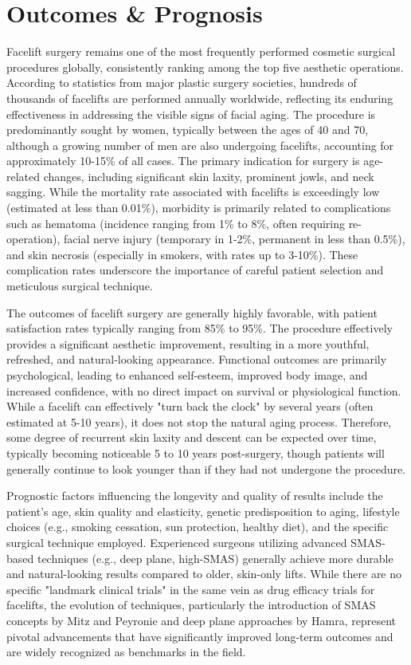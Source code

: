 \section*{Outcomes \& Prognosis}
Facelift surgery remains one of the most frequently performed cosmetic surgical procedures globally, consistently ranking among the top five aesthetic operations. According to statistics from major plastic surgery societies, hundreds of thousands of facelifts are performed annually worldwide, reflecting its enduring effectiveness in addressing the visible signs of facial aging. The procedure is predominantly sought by women, typically between the ages of 40 and 70, although a growing number of men are also undergoing facelifts, accounting for approximately 10-15\% of all cases. The primary indication for surgery is age-related changes, including significant skin laxity, prominent jowls, and neck sagging. While the mortality rate associated with facelifts is exceedingly low (estimated at less than 0.01\%), morbidity is primarily related to complications such as hematoma (incidence ranging from 1\% to 8\%, often requiring re-operation), facial nerve injury (temporary in 1-2\%, permanent in less than 0.5\%), and skin necrosis (especially in smokers, with rates up to 3-10\%). These complication rates underscore the importance of careful patient selection and meticulous surgical technique.

The outcomes of facelift surgery are generally highly favorable, with patient satisfaction rates typically ranging from 85\% to 95\%. The procedure effectively provides a significant aesthetic improvement, resulting in a more youthful, refreshed, and natural-looking appearance. Functional outcomes are primarily psychological, leading to enhanced self-esteem, improved body image, and increased confidence, with no direct impact on survival or physiological function. While a facelift can effectively "turn back the clock" by several years (often estimated at 5-10 years), it does not stop the natural aging process. Therefore, some degree of recurrent skin laxity and descent can be expected over time, typically becoming noticeable 5 to 10 years post-surgery, though patients will generally continue to look younger than if they had not undergone the procedure.

Prognostic factors influencing the longevity and quality of results include the patient's age, skin quality and elasticity, genetic predisposition to aging, lifestyle choices (e.g., smoking cessation, sun protection, healthy diet), and the specific surgical technique employed. Experienced surgeons utilizing advanced SMAS-based techniques (e.g., deep plane, high-SMAS) generally achieve more durable and natural-looking results compared to older, skin-only lifts. While there are no specific "landmark clinical trials" in the same vein as drug efficacy trials for facelifts, the evolution of techniques, particularly the introduction of SMAS concepts by Mitz and Peyronie and deep plane approaches by Hamra, represent pivotal advancements that have significantly improved long-term outcomes and are widely recognized as benchmarks in the field.

